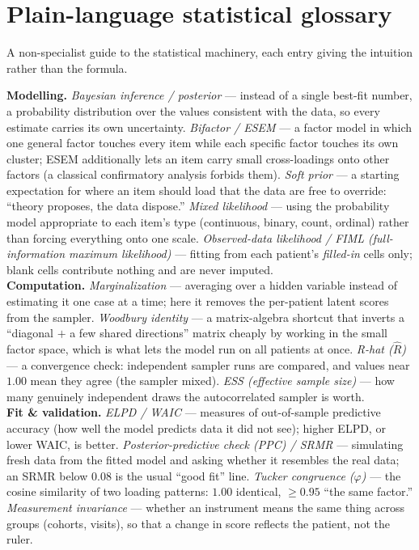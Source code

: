 \section{Plain-language statistical glossary}
\label{app:statglossary}
A non-specialist guide to the statistical machinery, each entry giving the intuition rather than the formula.
{\small

\textbf{Modelling.}
\emph{Bayesian inference / posterior} --- instead of a single best-fit number, a probability distribution over
the values consistent with the data, so every estimate carries its own uncertainty.
\emph{Bifactor / ESEM} --- a factor model in which one general factor touches every item while each specific
factor touches its own cluster; ESEM additionally lets an item carry small cross-loadings onto other factors
(a classical confirmatory analysis forbids them).
\emph{Soft prior} --- a starting expectation for where an item should load that the data are free to override:
``theory proposes, the data dispose.''
\emph{Mixed likelihood} --- using the probability model appropriate to each item's type (continuous, binary,
count, ordinal) rather than forcing everything onto one scale.
\emph{Observed-data likelihood / FIML (full-information maximum likelihood)} --- fitting from each patient's
\emph{filled-in} cells only; blank cells contribute nothing and are never imputed.\\[3pt]

\textbf{Computation.}
\emph{Marginalization} --- averaging over a hidden variable instead of estimating it one case at a time; here
it removes the per-patient latent scores from the sampler.
\emph{Woodbury identity} --- a matrix-algebra shortcut that inverts a ``diagonal $+$ a few shared directions''
matrix cheaply by working in the small factor space, which is what lets the model run on all patients at once.
\emph{R-hat ($\widehat{R}$)} --- a convergence check: independent sampler runs are compared, and values near
$1.00$ mean they agree (the sampler mixed).
\emph{ESS (effective sample size)} --- how many genuinely independent draws the autocorrelated sampler is
worth.\\[3pt]

\textbf{Fit \& validation.}
\emph{ELPD / WAIC} --- measures of out-of-sample predictive accuracy (how well the model predicts data it did
not see); higher ELPD, or lower WAIC, is better.
\emph{Posterior-predictive check (PPC) / SRMR} --- simulating fresh data from the fitted model and asking
whether it resembles the real data; an SRMR below $0.08$ is the usual ``good fit'' line.
\emph{Tucker congruence ($\varphi$)} --- the cosine similarity of two loading patterns: $1.00$ identical,
$\ge 0.95$ ``the same factor.''
\emph{Measurement invariance} --- whether an instrument means the same thing across groups (cohorts, visits),
so that a change in score reflects the patient, not the ruler.\\[3pt]

}
